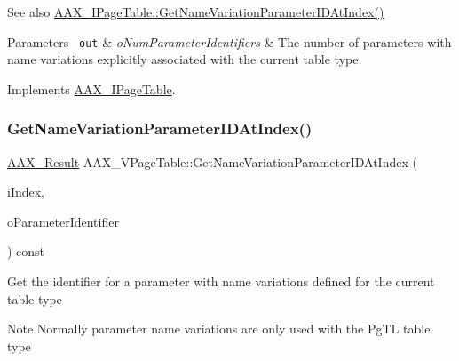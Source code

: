\begin{DoxyItemize}
\item \begin{DoxySeeAlso}{See also}
\mbox{\hyperlink{a01849_ac505024dd195c1965c54acac8f1f3016}{A\+A\+X\+\_\+\+I\+Page\+Table\+::\+Get\+Name\+Variation\+Parameter\+I\+D\+At\+Index()}}
\end{DoxySeeAlso}

\begin{DoxyParams}[1]{Parameters}
\mbox{\texttt{ out}}  & {\em o\+Num\+Parameter\+Identifiers} & The number of parameters with name variations explicitly associated with the current table type. \\
\hline
\end{DoxyParams}

\end{DoxyItemize}

Implements \mbox{\hyperlink{a01849_ad186d2870ad5c188a7375080e8a7907b}{A\+A\+X\+\_\+\+I\+Page\+Table}}.

\mbox{\label{a01929_a3066b8c3ab0868c23831778b939fadd7}} 
\subsubsection{\texorpdfstring{GetNameVariationParameterIDAtIndex()}{GetNameVariationParameterIDAtIndex()}}
{\footnotesize\ttfamily \mbox{\hyperlink{a00392_a4d8f69a697df7f70c3a8e9b8ee130d2f}{A\+A\+X\+\_\+\+Result}} A\+A\+X\+\_\+\+V\+Page\+Table\+::\+Get\+Name\+Variation\+Parameter\+I\+D\+At\+Index (\begin{DoxyParamCaption}\item[{int32\+\_\+t}]{i\+Index,  }\item[{\mbox{\hyperlink{a01873}{A\+A\+X\+\_\+\+I\+String}} \&}]{o\+Parameter\+Identifier }\end{DoxyParamCaption}) const\hspace{0.3cm}{\ttfamily [virtual]}}





Get the identifier for a parameter with name variations defined for the current table type

\begin{DoxyNote}{Note}
Normally parameter name variations are only used with the {\ttfamily \textquotesingle{}Pg\+TL\textquotesingle{}} table type
\end{DoxyNote}

